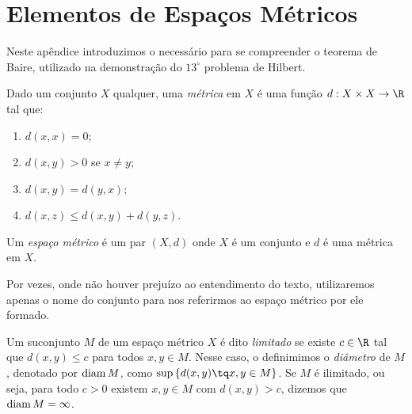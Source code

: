 \section{Elementos de Espaços Métricos}

Neste apêndice introduzimos o necessário para se compreender o teorema de Baire, utilizado na demonstração do \( 13^{ \circ } \) problema de Hilbert.

\begin{defn}
    Dado um conjunto \( X \) qualquer, uma \emph{métrica} em \( X \) é uma função \( d : X \times X \to \R \) tal que:
    \begin{enumerate}[label=\roman*)]
        \item \( d(x, x) = 0 \);
        \item \( d(x, y) > 0 \) se \( x \neq y \);
        \item \( d(x, y) = d(y, x) \);
        \item \( d(x, z) \leq d(x, y) + d(y, z) \).
    \end{enumerate}
\end{defn}


\begin{defn}
    Um \emph{espaço métrico} é um par \( ( X, d ) \) onde \( X \) é um conjunto e \( d \) é uma métrica em \( X \).
\end{defn}

    Por vezes, onde não houver prejuízo ao entendimento do texto, utilizaremos apenas o nome do conjunto para nos referirmos ao espaço métrico por ele formado.

\begin{defn}
    Um suconjunto \( M \) de um espaço métrico \( X \) é dito \emph{limitado} se existe \( c \in \R \) tal que \( d(x, y) \leq c \) para todos \( x, y \in M \).
    Nesse caso, o definimimos o \emph{diâmetro} de \( M \), denotado por \( \operatorname{diam} M \), como \( \sup \left\{ d(x, y) \tq x, y \in M \right\} \).
    Se \( M \) é ilimitado, ou seja, para todo \( c > 0 \) existem \( x, y \in M \) com \( d(x, y) > c \), dizemos que \( \operatorname{diam} M = \infty \).
\end{defn}



